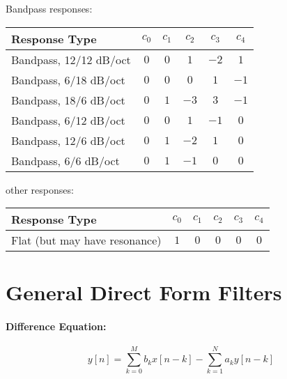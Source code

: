 Bandpass responses:
\begin{center}
\begin{tabular}{|l|c|c|c|c|c|}
 \hline
 Response Type                        & $c_0$ & $c_1$ & $c_2$ & $c_3$ & $c_4$                            \\
 \hline  
 Bandpass, 12/12 dB/oct               &  $0$  & $0$   & $1$   & $-2$  & $1$                              \\     
 Bandpass, 6/18 dB/oct                &  $0$  & $0$   & $0$   & $1$   & $-1$                             \\    
 Bandpass, 18/6 dB/oct                &  $0$  & $1$   & $-3$  & $3$   & $-1$                             \\     
 Bandpass, 6/12 dB/oct                &  $0$  & $0$   & $1$   & $-1$  & $0$                              \\     
 Bandpass, 12/6 dB/oct                &  $0$  & $1$   & $-2$  & $1$   & $0$                              \\    
 Bandpass, 6/6 dB/oct                 &  $0$  & $1$   & $-1$  & $0$   & $0$                              \\   
 \hline
\end{tabular}
\end{center}

other responses:
\begin{center}
\begin{tabular}{|l|c|c|c|c|c|}
 \hline
 Response Type                        & $c_0$ & $c_1$ & $c_2$ & $c_3$ & $c_4$                            \\
 \hline
 Flat (but may have resonance)        &  $1$  & $0$   & $0$   & $0$   & $0$                              \\     
 \hline
\end{tabular}
\end{center}








\section{General Direct Form Filters}

\paragraph{Difference Equation:}
\begin{equation}
 y[n] = \sum_{k=0}^M  b_k x[n-k] - \sum_{k=1}^N a_k y[n-k]
\end{equation}

